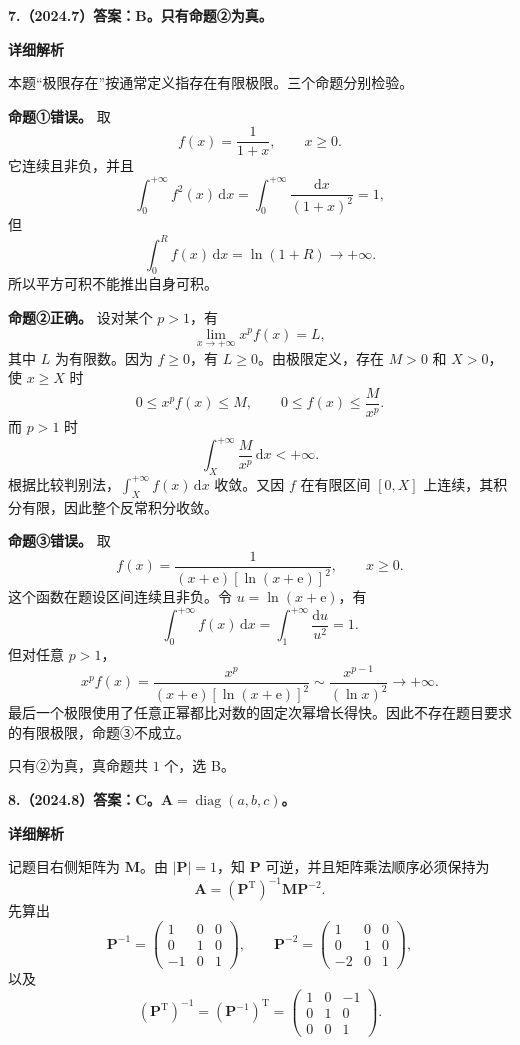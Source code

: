 \documentclass[UTF8,11pt,fontset=windows]{ctexart}
\begin{document}
\clearpage

\textbf{7.（2024.7）答案：B。只有命题②为真。}

\textbf{详细解析}

本题“极限存在”按通常定义指存在有限极限。三个命题分别检验。

\textbf{命题①错误。} 取
$$
f(x)=\frac1{1+x},\qquad x\ge0.
$$
它连续且非负，并且
$$
\int_0^{+\infty}f^2(x)\,\mathrm dx
=\int_0^{+\infty}\frac{\mathrm dx}{(1+x)^2}=1,
$$
但
$$
\int_0^R f(x)\,\mathrm dx=\ln(1+R)\longrightarrow+\infty.
$$
所以平方可积不能推出自身可积。

\textbf{命题②正确。} 设对某个 $p>1$，有
$$
\lim_{x\to+\infty}x^pf(x)=L,
$$
其中 $L$ 为有限数。因为 $f\ge0$，有 $L\ge0$。由极限定义，存在 $M>0$ 和 $X>0$，使 $x\ge X$ 时
$$
0\le x^pf(x)\le M,
\qquad 0\le f(x)\le\frac M{x^p}.
$$
而 $p>1$ 时
$$
\int_X^{+\infty}\frac M{x^p}\,\mathrm dx<+\infty.
$$
根据比较判别法，$\int_X^{+\infty}f(x)\,\mathrm dx$ 收敛。又因 $f$ 在有限区间 $[0,X]$ 上连续，其积分有限，因此整个反常积分收敛。

\textbf{命题③错误。} 取
$$
f(x)=\frac1{(x+\mathrm e)[\ln(x+\mathrm e)]^2},\qquad x\ge0.
$$
这个函数在题设区间连续且非负。令 $u=\ln(x+\mathrm e)$，有
$$
\int_0^{+\infty}f(x)\,\mathrm dx
=\int_1^{+\infty}\frac{\mathrm du}{u^2}=1.
$$
但对任意 $p>1$，
$$
x^pf(x)=\frac{x^p}{(x+\mathrm e)[\ln(x+\mathrm e)]^2}
\sim\frac{x^{p-1}}{(\ln x)^2}\longrightarrow+\infty.
$$
最后一个极限使用了任意正幂都比对数的固定次幂增长得快。因此不存在题目要求的有限极限，命题③不成立。

只有②为真，真命题共 $1$ 个，选 B。

\clearpage

\textbf{8.（2024.8）答案：C。$\boldsymbol A=\operatorname{diag}(a,b,c)$。}

\textbf{详细解析}

记题目右侧矩阵为 $\boldsymbol M$。由 $|\boldsymbol P|=1$，知 $\boldsymbol P$ 可逆，并且矩阵乘法顺序必须保持为
$$
\boldsymbol A=(\boldsymbol P^{\mathrm T})^{-1}
\boldsymbol M\boldsymbol P^{-2}.
$$
先算出
$$
\boldsymbol P^{-1}=\begin{pmatrix}1&0&0\\0&1&0\\-1&0&1\end{pmatrix},
\qquad
\boldsymbol P^{-2}=\begin{pmatrix}1&0&0\\0&1&0\\-2&0&1\end{pmatrix},
$$
以及
$$
(\boldsymbol P^{\mathrm T})^{-1}
=(\boldsymbol P^{-1})^{\mathrm T}
=\begin{pmatrix}1&0&-1\\0&1&0\\0&0&1\end{pmatrix}.
$$
\end{document}
